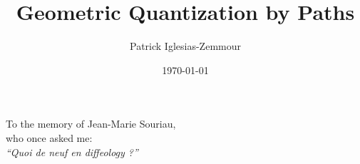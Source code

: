 \documentclass[10pt,reqno,letterpaper,twoside]{amsbook}
\title{Geometric Quantization by Paths}
\author{Patrick Iglesias-Zemmour}
\date{\today}
\begin{document}
  
  
  \maketitle
  
  
  \clearpage
  
  \null
  \vfill
  
  \begin{flushright}
    To the memory of Jean-Marie Souriau, \\
    who once asked me: \\
    \textit{``Quoi de neuf en diffeology ?''}
  \end{flushright}
  
  
  \renewcommand \thechapter{\Roman{chapter}}
  \renewcommand \thesection{\thechapter-\arabic{section}}
  
  \newcommand{\authorinfo}{%
  \begin{center}
    \rule{0.9\textwidth}{0.4pt} \\ [1em]
    {\large \textbf{About the Author}} \\ [0.5em]
    \begin{tabular}{c}
      Patrick Iglesias-Zemmour\\
      Einstein Institute of Mathematics \\
      The Hebrew University of Jerusalem \\
      Givat Ram, 9190401 Jerusalem, Israel\\
      \url{mailto:piz@math.huji.ac.il}\\
      \url{http://math.huji.ac.il/~piz}
    \end{tabular}
  \end{center}
  }
  
\end{document}
